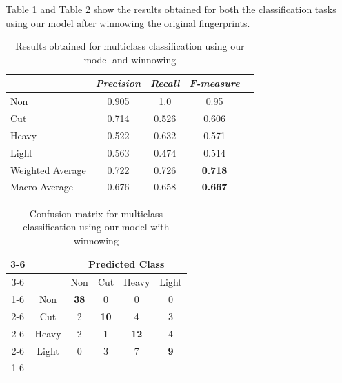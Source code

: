 \documentclass[11pt]{article}
\begin{document}
Table \ref{t5} and Table \ref{t6} show the results obtained for both the classification tasks using our model after winnowing the original fingerprints. 

\begin{table}[h]
\small
  \begin{center}
  \begin{tabularx}{\columnwidth}{|X|c|c|c|c|}
    \hline 
    \centering {\em  Class} & {\em  Precision} & {\em  Recall} & {\em  F-measure} \\ 
    \hline 
    \centering Non & 0.905 & 1.0 & 0.95 \\ 
    \hline 
    \centering Cut & 0.714 & 0.526 & 0.606 \\ 
    \hline 
    \centering Heavy & 0.522 & 0.632 & 0.571 \\ 
    \hline 
    \centering Light & 0.563 & 0.474 & 0.514 \\ 
    \hline 
    \centering Weighted Average & 0.722 & 0.726 & \textbf{0.718} \\ 
    \hline 
    \centering Macro Average & 0.676 & 0.658 & \textbf{0.667} \\ 
    \hline 
 \end{tabularx}
 \end{center}
 \caption{Results obtained for multiclass classification using our model and winnowing}
  \label{t5}
 \end{table}
 
 \begin{table}[h]
\small
    \begin{center}
     \begin{tabular}{cc|c|c|c|c|}
     \cline{3-6}
      & & \multicolumn{4}{c|}{Predicted Class}\\
      \cline{3-6}
      & & Non & Cut & Heavy & Light\\
      \cline{1-6}
      \multicolumn{1}{ |c| }{\multirow{4}{*}{\rotatebox{90}{Original}}} & Non & \textbf{38} & 0 & 0 & 0\\ 
      \cline{2-6} 
      \multicolumn{1}{ |c| }{} & Cut & 2 & \textbf{10} & 4 & 3 \\ 
      \cline{2-6} 
      \multicolumn{1}{ |c| }{} & Heavy & 2 & 1 & \textbf{12} & 4 \\ 
      \cline{2-6} 
      \multicolumn{1}{ |c| }{} & Light & 0 & 3 & 7 & \textbf{9} \\ 
      \cline{1-6}
     \end{tabular} 
    \end{center}
    \caption{Confusion matrix for multiclass classification using our model with winnowing}
	  \label{t6}
 \end{table}
\end{document}
